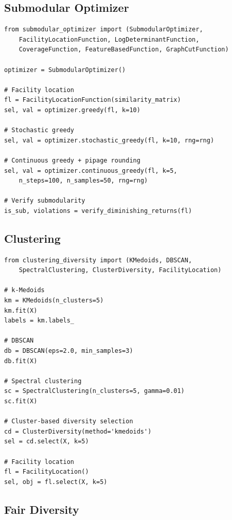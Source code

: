 \documentclass[11pt]{article}
\begin{document}
\subsection{Submodular Optimizer}

\begin{verbatim}
from submodular_optimizer import (SubmodularOptimizer,
    FacilityLocationFunction, LogDeterminantFunction,
    CoverageFunction, FeatureBasedFunction, GraphCutFunction)

optimizer = SubmodularOptimizer()

# Facility location
fl = FacilityLocationFunction(similarity_matrix)
sel, val = optimizer.greedy(fl, k=10)

# Stochastic greedy
sel, val = optimizer.stochastic_greedy(fl, k=10, rng=rng)

# Continuous greedy + pipage rounding
sel, val = optimizer.continuous_greedy(fl, k=5,
    n_steps=100, n_samples=50, rng=rng)

# Verify submodularity
is_sub, violations = verify_diminishing_returns(fl)
\end{verbatim}

\subsection{Clustering}

\begin{verbatim}
from clustering_diversity import (KMedoids, DBSCAN,
    SpectralClustering, ClusterDiversity, FacilityLocation)

# k-Medoids
km = KMedoids(n_clusters=5)
km.fit(X)
labels = km.labels_

# DBSCAN
db = DBSCAN(eps=2.0, min_samples=3)
db.fit(X)

# Spectral clustering
sc = SpectralClustering(n_clusters=5, gamma=0.01)
sc.fit(X)

# Cluster-based diversity selection
cd = ClusterDiversity(method='kmedoids')
sel = cd.select(X, k=5)

# Facility location
fl = FacilityLocation()
sel, obj = fl.select(X, k=5)
\end{verbatim}

\subsection{Fair Diversity}
\end{document}
